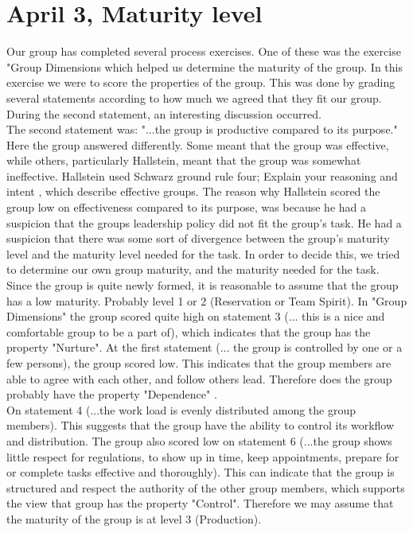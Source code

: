 \section{April 3, Maturity level}
Our group has completed several process exercises. One of these was the exercise "Group Dimensions which helped us determine the maturity of the group. In this exercise we were to score the properties of the group. This was done by grading several statements according to how much we agreed that they fit our group. During the second statement, an interesting discussion occurred. 
\\
The second statement was: "...the group is productive compared to its purpose." Here the group answered differently. Some meant that the group was effective, while others, particularly Hallstein, meant that the group was somewhat ineffective. Hallstein used Schwarz ground rule four; Explain your reasoning and intent \cite{EffectiveGroups}, which describe effective groups. The reason why Hallstein scored the group low on effectiveness compared to its purpose, was because he had a suspicion that the groups leadership policy did not fit the group's task. He had a suspicion that there was some sort of divergence between the group’s maturity level and the maturity level needed for the task. In order to decide this, we tried to determine our own group maturity, and the maturity needed for the task. 
\\
Since the group is quite newly formed, it is reasonable to assume that the group has a low maturity. Probably level 1 or 2 (Reservation or Team Spirit). In "Group Dimensions" the group scored quite high on statement 3 (... this is a nice and comfortable group to be a part of), which indicates that the group has the property "Nurture". At the first statement (... the group is controlled by one or a few persons), the group scored low. This indicates that the group members are able to agree with each other, and follow others lead. Therefore does the group probably have the property "Dependence" \cite{Maturity}.
\\
On statement 4 (...the work load is evenly distributed among the group members). This suggests that the group have the ability to control its workflow and distribution. The group also scored low on statement 6 (...the group shows little respect for regulations, to show up in time, keep appointments, prepare for or complete tasks effective and thoroughly). This can indicate that the group is structured and respect the authority of the other group members, which supports the view that group has the property "Control". Therefore we may assume that the maturity of the group is at level 3 (Production)\cite{Maturity}.
